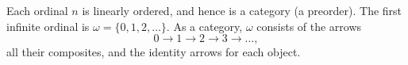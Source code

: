 Each ordinal $n$ is linearly ordered, and hence is a category (a preorder). The first infinite ordinal is $\omega = \{0, 1, 2, \ldots\}$. As a category, $\omega$ consists of the arrows
$$0 \to 1 \to 2 \to 3 \to \ldots,$$
all their composites, and the identity arrows for each object.
